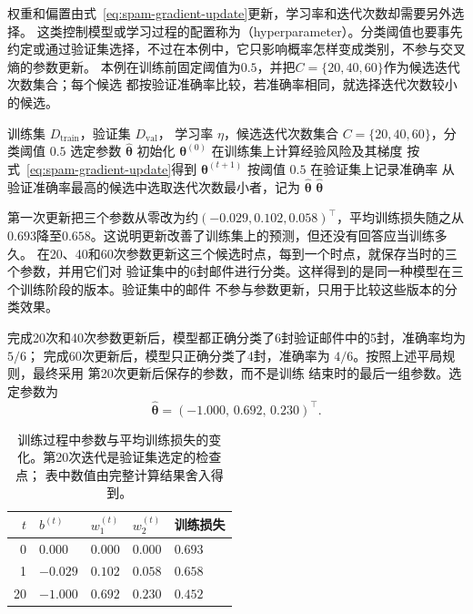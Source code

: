 权重和偏置由式~\eqref{eq:spam-gradient-update}更新，学习率和迭代次数却需要另外选择。
这类控制模型或学习过程的配置称为（hyperparameter）。分类阈值也要事先
约定或通过验证集选择，不过在本例中，它只影响概率怎样变成类别，不参与交叉熵的参数更新。
本例在训练前固定阈值为$0.5$，并把$C=\{20,40,60\}$作为候选迭代次数集合；每个候选
都按验证准确率比较，若准确率相同，就选择迭代次数较小的候选。

\begin{algorithm}[垃圾邮件分类器的训练]
  \label{alg:spam-training}
  \begin{algorithmic}[1]
    \Require 训练集 $D_{\mathrm{train}}$，验证集 $D_{\mathrm{val}}$，
      学习率 $\eta$，候选迭代次数集合 $C=\{20,40,60\}$，分类阈值 $0.5$
    \Ensure 选定参数 $\hat{\bm{\theta}}$
    \State 初始化 $\bm{\theta}^{(0)}$
      \State 在训练集上计算经验风险及其梯度
      \State 按式~\eqref{eq:spam-gradient-update}得到 $\bm{\theta}^{(t+1)}$
        \State 按阈值 $0.5$ 在验证集上记录准确率
      \EndIf
    \EndFor
    \State 从验证准确率最高的候选中选取迭代次数最小者，记为 $\hat{\bm{\theta}}$
    \State \Return $\hat{\bm{\theta}}$
  \end{algorithmic}
\end{algorithm}

第一次更新把三个参数从零改为约$(-0.029,0.102,0.058)^{\top}$，平均训练损失随之从
$0.693$降至$0.658$。这说明更新改善了训练集上的预测，但还没有回答应当训练多久。
在20、40和60次参数更新这三个候选时点，每到一个时点，就保存当时的三个参数，并用它们对
验证集中的6封邮件进行分类。这样得到的是同一种模型在三个训练阶段的版本。验证集中的邮件
不参与参数更新，只用于比较这些版本的分类效果。

完成20次和40次参数更新后，模型都正确分类了6封验证邮件中的5封，准确率均为 $5/6$；
完成60次更新后，模型只正确分类了4封，准确率为 $4/6$。按照上述平局规则，最终采用
第20次更新后保存的参数，而不是训练
结束时的最后一组参数。选定参数为
\begin{equation}
  \hat{\bm{\theta}}=(-1.000,\,0.692,\,0.230)^{\top}.
  \label{eq:spam-fitted-parameters}
\end{equation}

\begin{table}[htbp]
  \centering
  \small
  \begin{tabularx}{\linewidth}{@{}rXXXX@{}}
    \toprule
    $t$ & $b^{(t)}$ & $w_1^{(t)}$ & $w_2^{(t)}$ & 训练损失 \\
    \midrule
    0  & $0.000$  & $0.000$ & $0.000$ & $0.693$ \\
    1  & $-0.029$ & $0.102$ & $0.058$ & $0.658$ \\
    20 & $-1.000$ & $0.692$ & $0.230$ & $0.452$ \\
    \bottomrule
  \end{tabularx}
  \caption{训练过程中参数与平均训练损失的变化。第20次迭代是验证集选定的检查点；
  表中数值由完整计算结果舍入得到。}
  \label{tab:spam-training-record}
\end{table}

